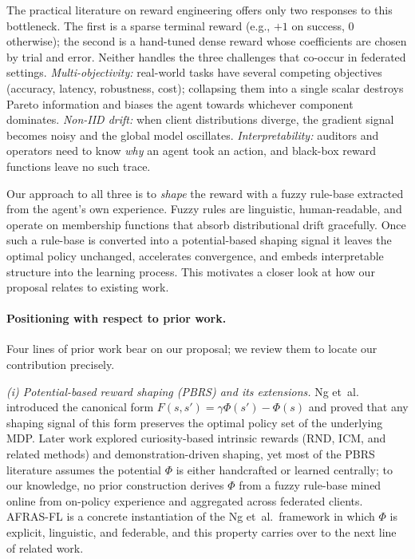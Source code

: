 \documentclass[journal]{IEEEtran}
\begin{document}
The practical literature on reward engineering offers only two
responses to this bottleneck. The first is a sparse terminal reward
(e.g., $+1$ on success, $0$ otherwise); the second is a hand-tuned
dense reward whose coefficients are chosen by trial and error.
Neither handles the three challenges that co-occur in federated
settings. \emph{Multi-objectivity:} real-world tasks have several
competing objectives (accuracy, latency, robustness, cost); collapsing
them into a single scalar destroys Pareto information and biases the
agent towards whichever component dominates\cite{li2022review}.
\emph{Non-IID drift:} when client distributions diverge, the gradient
signal becomes noisy and the global model oscillates\cite{li2020fedprox,
li2024federated_noniid}. \emph{Interpretability:} auditors and
operators need to know \emph{why} an agent took an action, and
black-box reward functions leave no such trace\cite{lundberg2017shap,
ribeiro2016lime,arrieta2020xai}.

Our approach to all three is to \emph{shape} the reward with a fuzzy
rule-base extracted from the agent's own experience. Fuzzy rules are
linguistic, human-readable, and operate on membership functions that
absorb distributional drift gracefully. Once such a rule-base is
converted into a potential-based shaping signal it leaves the optimal
policy unchanged\cite{ng1999policy_invariance}, accelerates
convergence, and embeds interpretable structure into the learning
process. This motivates a closer look at how our proposal relates to
existing work.

\paragraph{Positioning with respect to prior work.}
Four lines of prior work bear on our proposal; we review them to
locate our contribution precisely.

\emph{(i) Potential-based reward shaping (PBRS) and its
extensions.} Ng et~al.\cite{ng1999policy_invariance} introduced the
canonical form $F(s,s') = \gamma \Phi(s') - \Phi(s)$ and proved that
any shaping signal of this form preserves the optimal policy set of
the underlying MDP. Later work explored curiosity-based intrinsic
rewards (RND, ICM, and related methods) and demonstration-driven
shaping, yet most of the PBRS literature assumes the potential
$\Phi$ is either handcrafted or learned centrally; to our knowledge,
no prior construction derives $\Phi$ from a fuzzy rule-base mined
online from on-policy experience and aggregated across federated
clients. AFRAS-FL is a concrete instantiation of the Ng et~al.\
framework in which $\Phi$ is explicit, linguistic, and federable,
and this property carries over to the next line of related work.
\end{document}
